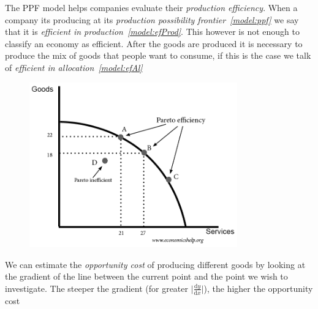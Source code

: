 \documentclass[english,course]{Notes}
\newcommand{\ita}[1]{\textit{#1}}
\begin{document}

\par{The PPF model helps companies evaluate their \ita{production efficiency}. When a company its producing at its \ita{production possibility frontier~\ref{model:ppf}} we say that it is \ita{efficient in production~\ref{model:efProd}}. This however is not enough to classify an economy as efficient. After the goods are produced it is necessary to produce the mix of goods that people want to consume, if this is the case we talk of \ita{efficient in allocation~\ref{model:efAl}}}


\begin{figure}[ht]
\centering
\includegraphics[width=0.8\textwidth]{ppf.png}
\end{figure}

\par{We can estimate the \ita{opportunity cost} of producing different goods by looking at the gradient of the line between the current point and the point we wish to investigate. The steeper the gradient (for greater $\Big|\frac{\mathrm{d}y}{\mathrm{d}x}\Big| $), the higher the opportunity cost}
\end{document}
